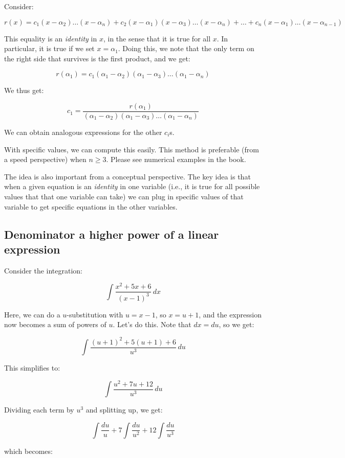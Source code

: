 \documentclass[10pt]{amsart}
\begin{document}
Consider:

$$r(x) = c_1(x - \alpha_2) \dots (x - \alpha_n) + c_2(x - \alpha_1)(x - \alpha_3) \dots (x - \alpha_n) + \dots + c_n(x - \alpha_1) \dots (x - \alpha_{n-1})$$

This equality is an {\em identity} in $x$, in the sense that it is
true for all $x$. In particular, it is true if we set $x =
\alpha_1$. Doing this, we note that the only term on the right side
that survives is the first product, and we get:

$$r(\alpha_1) = c_1(\alpha_1 - \alpha_2)(\alpha_1 - \alpha_3) \dots (\alpha_1 - \alpha_n)$$

We thus get:

$$c_1 = \frac{r(\alpha_1)}{(\alpha_1 - \alpha_2)(\alpha_1 - \alpha_3) \dots (\alpha_1 - \alpha_n)}$$

We can obtain analogous expressions for the other $c_i$s.

With specific values, we can compute this easily. This method is
preferable (from a speed perspective) when $n \ge 3$. Please see
numerical examples in the book.

The idea is also important from a conceptual perspective. The key idea
is that when a given equation is an {\em identity} in one variable
(i.e., it is true for all possible values that that one variable can
take) we can plug in specific values of that variable to get specific
equations in the other variables.

\subsection{Denominator a higher power of a linear expression}

Consider the integration:

$$\int \frac{x^2 + 5x + 6}{(x - 1)^3} \, dx$$

Here, we can do a $u$-substitution with $u = x - 1$, so $x = u + 1$,
and the expression now becomes a sum of powers of $u$. Let's do
this. Note that $dx = du$, so we get:

$$\int \frac{(u + 1)^2 + 5(u + 1) + 6}{u^3} \, du$$

This simplifies to:

$$\int \frac{u^2 + 7u + 12}{u^3} \, du$$

Dividing each term by $u^3$ and splitting up, we get:

$$\int \frac{du}{u} + 7 \int \frac{du}{u^2} + 12 \int \frac{du}{u^3}$$

which becomes:
\end{document}
